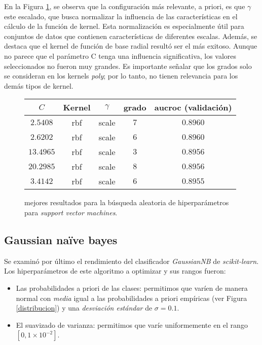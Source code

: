 En la Figura \ref{support vector machines}, se observa que la configuración más relevante, a priori, es que $\gamma$ este escalado, que busca normalizar la influencia de las características en el cálculo de la función de kernel. Esta normalización es especialmente útil para conjuntos de datos que contienen características de diferentes escalas. Además, se destaca que el kernel de función de base radial resultó ser el más exitoso. Aunque no parece que el parámetro C tenga una influencia significativa, los valores seleccionados no fueron muy grandes. Es importante señalar que los grados solo se consideran en los kernels \textit{poly}; por lo tanto, no tienen relevancia para los demás tipos de kernel.
\vspace{0.5em}
\begin{figure}[!htbp]
    \begin{center}
        \begin{tabular}{ |c|c|c|c|c| } 
         \hline
        $C$ & Kernel & $\gamma$ & grado & aucroc (validación) \\
        \hline
        $2.5408$ & rbf     & scale & $7$ & $0.8960$ \\ 
        $2.6202$ & rbf    & scale & $6$ & $0.8960$ \\
        $13.4965$ & rbf   & scale & $3$ & $0.8956$ \\ 
        $20.2985$ & rbf   & scale & $8$ & $0.8956$ \\
        $3.4142$ & rbf    & scale & $6$ & $0.8955$ \\ 
        \hline
        \end{tabular}
    \end{center}
    \caption{mejores resultados para la búsqueda aleatoria de hiperparámetros para \textit{support vector machines}.} \label{support vector machines}
\end{figure}

\subsection{Gaussian naïve bayes}
Se examinó por último el rendimiento del clasificador \textit{GaussianNB} de \textit{scikit-learn}. Los hiperparámetros de este algoritmo a optimizar y sus rangos fueron:

\begin{itemize}
    \item Las probabilidades a priori de las clases: permitimos que varíen de manera normal con \textit{media} igual a las probabilidades a priori empíricas (ver Figura \ref{distribucion}) y una \textit{desviación estándar} de $\sigma = 0.1$.
    \item El suavizado de varianza: permitimos que varíe uniformemente en el rango $[0, 1 \times 10^{-2}]$.
\end{itemize}

